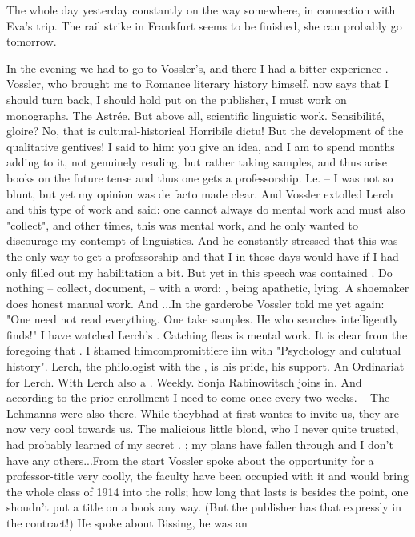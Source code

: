 
The whole day yesterday constantly on the way somewhere, in connection with Eva's trip. The rail strike in Frankfurt seems to be finished, she can probably go tomorrow. \missing

In the evening we had to go to Vossler's, and there I had a bitter experience . Vossler, who brought me to Romance literary history himself, now says that I should turn back, I should hold put on the publisher, I must work on monographs. The Astrée. But above all, scientific linguistic work. Sensibilité, gloire? No, that is cultural-historical Horribile dictu! But the development of the qualitative gentives! I said to him: you give an idea, and I am to spend months adding to it, not genuinely reading, but rather taking samples, and thus arise books on the future tense and thus one gets a professorship. I.e. -- I was not so blunt, but yet my opinion was de facto made clear. And Vossler extolled Lerch and this type of work and said: one cannot always do mental work and must also "collect", and other times, this was mental work, and he only wanted to discourage my contempt of linguistics. And he constantly stressed that this was the only way to get a professorship and that I in those days would have  if I had only filled out my habilitation a bit. But yet in this speech was contained . Do nothing -- collect, document,  -- with a word: , being apathetic, lying. A shoemaker does honest manual work. And ...In the garderobe Vossler told me yet again: "One need not read everything. One take samples. He who searches intelligently finds!" I have watched Lerch's . Catching fleas is mental work. It is clear from the foregoing that . I \.{shamed him}{compromittiere ihn} with "Psychology and culutual history". Lerch, the philologist with the , is his pride, his support. An Ordinariat for Lerch. With Lerch also a . Weekly. Sonja Rabinowitsch joins in. And according to the prior enrollment I need to come once every two weeks. -- The Lehmanns were also there. While theybhad at first wantes to invite us, they are now very cool towards us. The malicious little blond, who I never quite trusted, had probably learned of my secret . ; my plans have fallen through and I don't have any others...From the start Vossler spoke about the opportunity for a professor-title very coolly, the faculty have been occupied with it and would bring the whole class of 1914 into the rolls; how long that lasts is besides the point, one shoudn't put a title on a book any way. (But the publisher has that expressly in the contract!) He spoke  about Bissing, he was an 